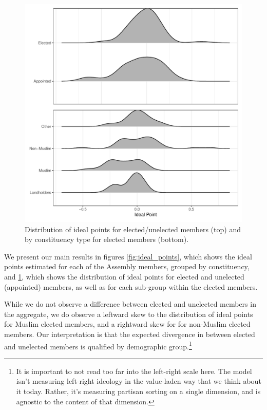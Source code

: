 \documentclass[12pt,letter]{article}
\begin{document}
\begin{figure}
    \centering
    \includegraphics[width=\linewidth]{../figs/ridges_combined.pdf}
    \caption{Distribution of ideal points for elected/unelected members (top) and by constituency type for elected members (bottom).}
    \label{fig:ideal_dist}
\end{figure}

We present our main results in figures \ref{fig:ideal_points}, which shows the ideal points estimated for each of the Assembly members, grouped by constituency, and \ref{fig:ideal_dist}, which shows the distribution of ideal points for elected and unelected (appointed) members, as well as for each sub-group within the elected members.

While we do not observe a difference between elected and unelected members in the aggregate, we do observe a leftward skew to the distribution of ideal points for Muslim elected members, and a rightward skew for for non-Muslim elected members. Our interpretation is that the expected divergence in between elected and unelected members is qualified by demographic group.\footnote{It is important to not read too far into the left-right scale here. The model isn't measuring left-right ideology in the value-laden way that we think about it today. Rather, it's measuring partisan sorting on a single dimension, and is agnostic to the content of that dimension.}
\end{document}
